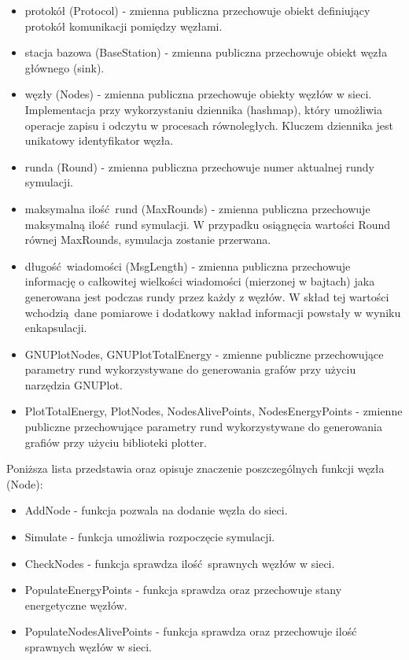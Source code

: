 \documentclass[a4paper,12pt,twoside,openany]{report}
\begin{document}
\begin{itemize}
 \item protokół (Protocol) - zmienna publiczna przechowuje obiekt definiujący protokół komunikacji pomiędzy węzłami.
 \item stacja bazowa (BaseStation) - zmienna publiczna przechowuje obiekt węzła głównego (sink).
 \item węzły (Nodes) - zmienna publiczna przechowuje obiekty węzłów w sieci. Implementacja przy wykorzystaniu dziennika (hashmap), 
       który umożliwia operacje zapisu i odczytu w procesach równoległych. Kluczem dziennika jest unikatowy identyfikator węzła.
 \item runda (Round) - zmienna publiczna przechowuje numer aktualnej rundy symulacji.
 \item maksymalna ilość rund (MaxRounds) - zmienna publiczna przechowuje maksymalną ilość rund symulacji. 
       W przypadku osiągnęcia wartości Round równej MaxRounds, symulacja zostanie przerwana.
 \item długość wiadomości (MsgLength) - zmienna publiczna przechowuje informację o całkowitej wielkości wiadomości (mierzonej w bajtach) jaka generowana
       jest podczas rundy przez każdy z węzłów. W skład tej wartości wchodzią dane pomiarowe i dodatkowy nakład informacji powstały w wyniku enkapsulacji.
 \item GNUPlotNodes, GNUPlotTotalEnergy - zmienne publiczne przechowujące parametry rund wykorzystywane do generowania grafów przy użyciu narzędzia GNUPlot.
 \item PlotTotalEnergy, PlotNodes, NodesAlivePoints, NodesEnergyPoints - zmienne publiczne przechowujące parametry rund wykorzystywane do generowania grafiów
       przy użyciu biblioteki plotter.
\end{itemize}

Poniższa lista przedstawia oraz opisuje znaczenie poszczególnych funkcji węzła (Node):

\begin{itemize}
 \item AddNode - funkcja pozwala na dodanie węzła do sieci.
 \item Simulate - funkcja umożliwia rozpoczęcie symulacji.
 \item CheckNodes - funkcja sprawdza ilość sprawnych węzłów w sieci.
 \item PopulateEnergyPoints - funkcja sprawdza oraz przechowuje stany energetyczne węzłów.
 \item PopulateNodesAlivePoints - funkcja sprawdza oraz przechowuje ilość sprawnych węzłów w sieci.
\end{itemize}
\end{document}
